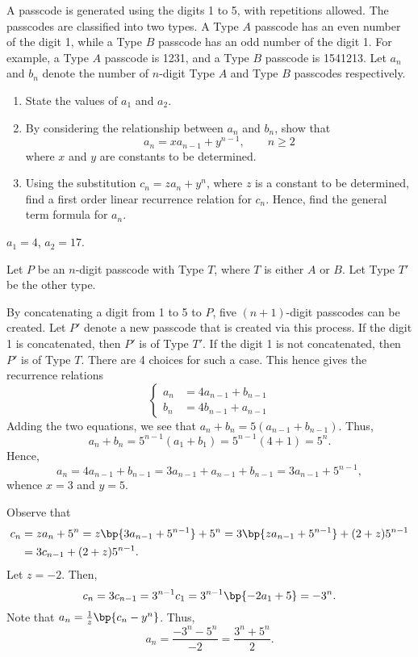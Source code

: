 \begin{problem}
    A passcode is generated using the digits 1 to 5, with repetitions allowed. The passcodes are classified into two types. A Type $A$ passcode has an even number of the digit 1, while a Type $B$ passcode has an odd number of the digit 1. For example, a Type $A$ passcode is 1231, and a Type $B$ passcode is 1541213. Let $a_n$ and $b_n$ denote the number of $n$-digit Type $A$ and Type $B$ passcodes respectively.

    \begin{enumerate}
        \item State the values of $a_1$ and $a_2$.
        \item By considering the relationship between $a_n$ and $b_n$, show that
        \[
            a_n = xa_{n-1} + y^{n-1}, \qquad n \geq 2
        \]
        where $x$ and $y$ are constants to be determined.
        \item Using the substitution $c_n = za_n + y^n$, where $z$ is a constant to be determined, find a first order linear recurrence relation for $c_n$. Hence, find the general term formula for $a_n$.
    \end{enumerate}
\end{problem}
\begin{solution}
    \begin{ppart}
        $a_1 = 4$, $a_2 = 17$.
    \end{ppart}
    \begin{ppart}
        Let $P$ be an $n$-digit passcode with Type $T$, where $T$ is either $A$ or $B$. Let Type $T'$ be the other type.
            
        By concatenating a digit from 1 to 5 to $P$, five $(n+1)$-digit passcodes can be created. Let $P'$ denote a new passcode that is created via this process. If the digit 1 is concatenated, then $P'$ is of Type $T'$. If the digit 1 is not concatenated, then $P'$ is of Type $T$. There are 4 choices for such a case. This hence gives the recurrence relations \[\left\{ \begin{aligned}
            a_n &= 4a_{n-1} + b_{n-1}\\
            b_n &= 4b_{n-1} + a_{n-1}
        \end{aligned}\right.\] Adding the two equations, we see that $a_n + b_n = 5(a_{n-1} + b_{n-1})$. Thus, \[a_n + b_n = 5^{n-1}(a_1 + b_1) = 5^{n-1}(4 + 1) = 5^n.\] Hence, \[a_n = 4a_{n-1} + b_{n-1} = 3a_{n-1} + a_{n-1} + b_{n-1} = 3a_{n-1} + 5^{n-1},\] whence $x = 3$ and $y = 5$.
    \end{ppart}
    \begin{ppart}
        Observe that
        \begin{align*}
            c_n &= za_n + 5^n = z\bp{3a_{n-1} + 5^{n-1}} + 5^n = 3\bp{za_{n-1} + 5^{n-1}} + (2 + z) 5^{n-1}\\
            &= 3c_{n-1} + (2 + z) 5^{n-1}.
        \end{align*}
        Let $z = -2$. Then, \[c_n = 3c_{n-1} = 3^{n-1} c_1 = 3^{n-1} \bp{-2a_1 + 5} = -3^n.\] Note that $a_n = \frac1z \bp{c_n - y^n}$. Thus, \[a_n = \frac{-3^n - 5^n}{-2} = \frac{3^n + 5^n}2.\]
    \end{ppart}
\end{solution}